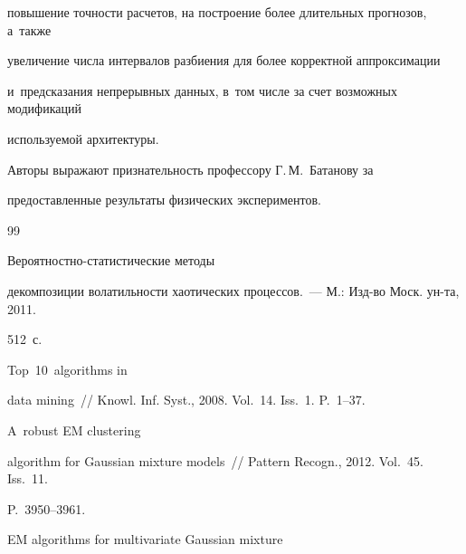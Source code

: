 повышение точности расчетов, на построение более длительных прогнозов, а~также 


увеличение числа интервалов разбиения для более корректной аппроксимации 


и~предсказания непрерывных данных, в~том числе за счет возможных модификаций 


используемой архитектуры.





\bigskip


{Авторы выражают признательность профессору Г.\,М.~Батанову за 


предостав\-лен\-ные результаты физических экспериментов.}





{\small\frenchspacing


{%




\begin{thebibliography}{99}





  Вероятностно-ста\-ти\-сти\-че\-ские методы 


декомпозиции волатильности хаотических процессов.~--- М.: Изд-во Моск. ун-та, 2011. 


512~с.







 Top~10~algorithms in 


data mining~/\!\!/ Knowl. Inf. Syst., 2008. Vol.~14. Iss.~1. P.~1--37.







 A~robust EM clustering 


algorithm for Gaussian mixture models~/\!\!/ Pattern Recogn., 2012. Vol.~45. Iss.~11. 


P.~3950--3961.







 EM algorithms for multivariate Gaussian mixture 



\end{thebibliography}}}
